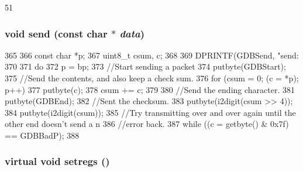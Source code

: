 \begin{DoxyCode}
51 {}
\end{DoxyCode}
\hypertarget{classBaseRemoteGDB_ab5ecea9b4516973a35d89b23c4b7961f}{
\subsubsection[{send}]{\setlength{\rightskip}{0pt plus 5cm}void send (const char $\ast$ {\em data})}}
\label{classBaseRemoteGDB_ab5ecea9b4516973a35d89b23c4b7961f}



\begin{DoxyCode}
365 {
366     const char *p;
367     uint8_t csum, c;
368 
369     DPRINTF(GDBSend, "send:  %
370 
371     do {
372         p = bp;
373         //Start sending a packet
374         putbyte(GDBStart);
375         //Send the contents, and also keep a check sum.
376         for (csum = 0; (c = *p); p++) {
377             putbyte(c);
378             csum += c;
379         }
380         //Send the ending character.
381         putbyte(GDBEnd);
382         //Sent the checksum.
383         putbyte(i2digit(csum >> 4));
384         putbyte(i2digit(csum));
385         //Try transmitting over and over again until the other end doesn't send a
      n
386         //error back.
387     } while ((c = getbyte() & 0x7f) == GDBBadP);
388 }
\end{DoxyCode}
\hypertarget{classBaseRemoteGDB_a6b0b51dc196f12756cc0ec49a3ae6a6a}{
\subsubsection[{setregs}]{\setlength{\rightskip}{0pt plus 5cm}virtual void setregs ()}}
\label{classBaseRemoteGDB_a6b0b51dc196f12756cc0ec49a3ae6a6a}


